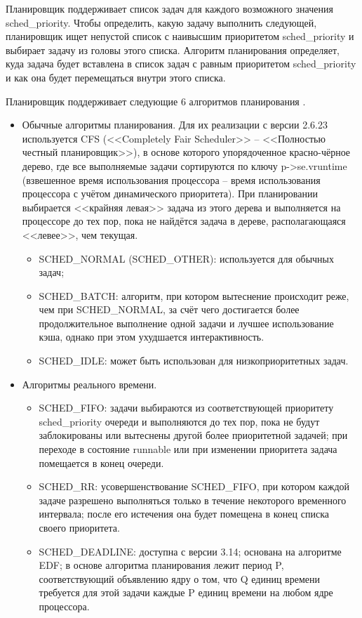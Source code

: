 Планировщик поддерживает список задач для каждого возможного значения sched\_priority. Чтобы определить, какую задачу выполнить следующей, планировщик ищет непустой список с наивысшим приоритетом sched\_priority и выбирает задачу из головы этого списка. Алгоритм планирования определяет, куда задача будет вставлена в список задач с равным приоритетом sched\_priority и как она будет перемещаться внутри этого списка. 

Планировщик поддерживает следующие 6 алгоритмов планирования \cite{bib:2}.
\begin{itemize}
    \item Обычные алгоритмы планирования. Для их реализации с версии 2.6.23 используется CFS (<<Completely Fair Scheduler>> -- <<Полностью честный планировщик>>), в основе которого упорядоченное красно-чёрное дерево, где все выполняемые задачи сортируются по ключу p->se.vruntime (взвешенное время использования процессора -- время использования процессора с учётом динамического приоритета). При планировании выбирается <<крайняя левая>> задача из этого дерева и выполняется на процессоре до тех пор, пока не найдётся задача в дереве, располагающаяся <<левее>>, чем текущая. 
    \begin{itemize}
        \item SCHED\_NORMAL (SCHED\_OTHER): используется для обычных задач;
        \item SCHED\_BATCH: алгоритм, при котором вытеснение происходит реже, чем при SCHED\_NORMAL, за счёт чего достигается более продолжительное выполнение одной задачи и лучшее использование кэша, однако при этом ухудшается интерактивность. 
        \item SCHED\_IDLE: может быть использован для низкоприоритетных задач.
    \end{itemize}
    \item Алгоритмы реального времени. 
    \begin{itemize}
        \item SCHED\_FIFO: задачи выбираются из соответствующей приоритету sched\_priority очереди и выполняются до тех пор, пока не будут заблокированы или вытеснены другой более приоритетной задачей; при переходе в состояние runnable или при изменении приоритета задача помещается в конец очереди.
        \item SCHED\_RR: усовершенствование SCHED\_FIFO, при котором каждой задаче разрешено выполняться только в течение некоторого временного интервала; после его истечения она будет помещена в конец списка своего приоритета.
        \item SCHED\_DEADLINE: доступна с версии 3.14; основана на алгоритме EDF; в основе алгоритма планирования лежит период P, соответствующий объявлению ядру о том, что Q единиц времени требуется для этой задачи каждые P единиц времени на любом ядре процессора.
    \end{itemize}
\end{itemize}


